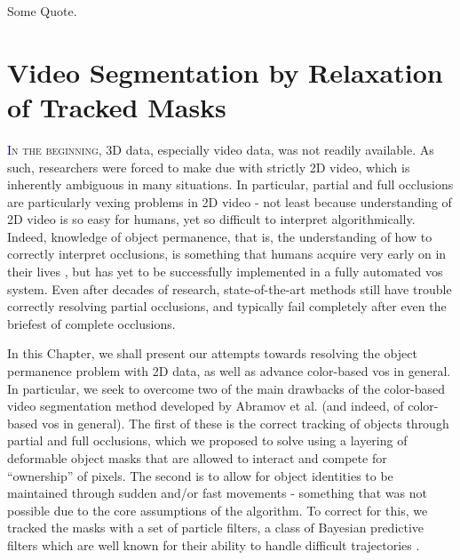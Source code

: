 \begin{savequote}[75mm]
Some Quote.
\end{savequote}


\chapter{Video Segmentation by Relaxation of Tracked Masks}
\label{Chap:VideoSegRelaxation}
\lettrine[lines=3, loversize=0.3]{\textcolor{DarkBlue}I}{n the beginning}, 3D data, especially video data, was not readily available. As such, researchers were forced to make due with strictly 2D video, which is inherently ambiguous in many situations. In particular, partial and full occlusions are particularly vexing problems in 2D video - not least because understanding of 2D video is so easy for humans, yet so difficult to interpret algorithmically. Indeed, knowledge of object permanence, that is, the understanding of how to correctly interpret occlusions, is something that humans acquire very early on in their lives \cite{ObjectPermanence}, but has yet to be successfully implemented in a fully automated \gls{vos} system. Even after decades of research, state-of-the-art methods still have trouble correctly resolving partial occlusions, and typically fail completely after even the briefest of complete occlusions.

In this Chapter, we shall present our attempts towards resolving the object permanence problem with 2D data, as well as advance color-based \gls{vos} in general. In particular, we seek to overcome two of the main drawbacks of the color-based video segmentation method developed by Abramov et al. \cite{Abramov_RealtimeSegmentation} (and indeed, of color-based \gls{vos} in general). The first of these is the correct tracking of objects through partial and full occlusions, which we proposed to solve using a layering of deformable object masks that are allowed to interact and compete for ``ownership'' of pixels. The second is to allow for object identities to be maintained through sudden and/or fast movements - something that was not possible due to the core assumptions of the algorithm. To correct for this, we tracked the masks with a set of particle filters, a class of Bayesian predictive filters which are well known for their ability to handle difficult trajectories \cite{TrackingMultipleParticleFiltering,MonteCarloMTT,SequentialMonteCarloMultitargetFiltering}.

